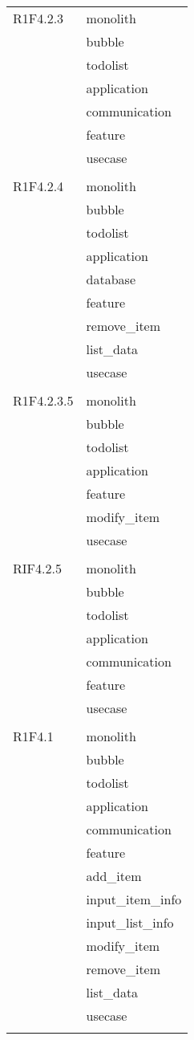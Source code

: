 \begin{center}
\begin{longtable}{|p{7cm}|p{5cm}|}
		R1F4.2.3 & monolith \\ & bubble \\ & todolist \\ & application \\ & communication \\ & feature \\ & usecase \\ & \\ \hline
		R1F4.2.4 & monolith \\ & bubble \\ & todolist \\ & application \\ & database \\ & feature \\ & remove\_item \\ & list\_data \\ & usecase \\ & \\ \hline
		R1F4.2.3.5 & monolith \\ & bubble \\ & todolist \\ & application \\ & feature \\ & modify\_item \\ & usecase \\ & \\ \hline
		RIF4.2.5 & monolith \\ & bubble \\ & todolist \\ & application \\ & communication \\ & feature \\ & usecase \\ & \\ \hline
		R1F4.1 & monolith \\ & bubble \\ & todolist \\ & application \\ & communication \\ & feature \\ & add\_item \\ & input\_item\_info \\ & input\_list\_info \\ & modify\_item \\ & remove\_item \\ & list\_data \\ & usecase \\ & \\ \hline

\end{longtable}
\end{center}
